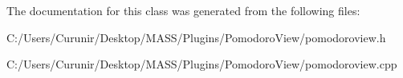 The documentation for this class was generated from the following files\+:\begin{DoxyCompactItemize}
\item 
C\+:/\+Users/\+Curunir/\+Desktop/\+M\+A\+S\+S/\+Plugins/\+Pomodoro\+View/pomodoroview.\+h\item 
C\+:/\+Users/\+Curunir/\+Desktop/\+M\+A\+S\+S/\+Plugins/\+Pomodoro\+View/pomodoroview.\+cpp\end{DoxyCompactItemize}

